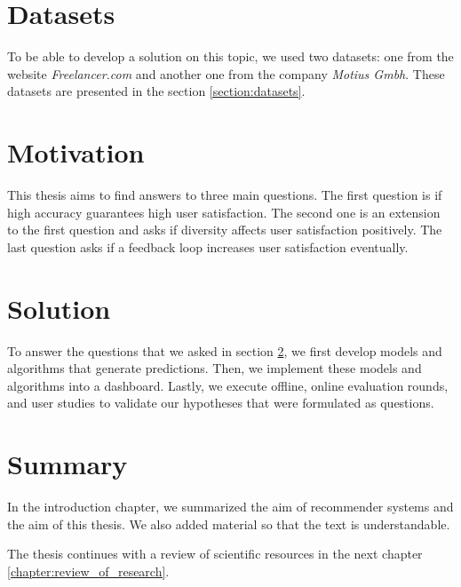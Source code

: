 \section{Datasets}\label{section:intro-datasets}

To be able to develop a solution on this topic, we used two datasets: one from the website \textit{Freelancer.com} and another one from the company \textit{Motius Gmbh}. These datasets are presented in the section \ref{section:datasets}.


\section{Motivation}\label{section:motivation}

This thesis aims to find answers to three main questions. The first question is if high accuracy guarantees high user satisfaction. The second one is an extension to the first question and asks if diversity affects user satisfaction positively. The last question asks if a feedback loop increases user satisfaction eventually.


\section{Solution}

To answer the questions that we asked in section \ref{section:motivation}, we first develop models and algorithms that generate predictions. Then, we implement these models and algorithms into a dashboard. Lastly, we execute offline, online evaluation rounds, and user studies to validate our hypotheses that were formulated as questions.

\section{Summary}

In the introduction chapter, we summarized the aim of recommender systems and the aim of this thesis. We also added material so that the text is understandable.

The thesis continues with a review of scientific resources in the next chapter \ref{chapter:review_of_research}.